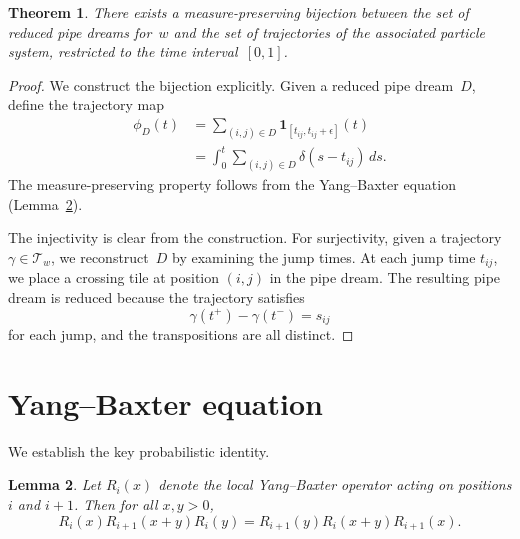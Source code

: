 \documentclass{amsart}
\theoremstyle{plain}
\newtheorem{theorem}{Theorem}[section]
\newtheorem{lemma}[theorem]{Lemma}
\theoremstyle{definition}
\theoremstyle{remark}
\begin{document}
\begin{theorem}
\label{thm:main-bijection}
There exists a measure-preserving bijection between the set of reduced
pipe dreams for~$w$ and the set of trajectories of the associated
particle system, restricted to the time interval~$[0,1]$.
\end{theorem}
\begin{proof}
We construct the bijection explicitly.  Given a reduced pipe dream~$D$,
define the trajectory map
\begin{align}
\label{eq:trajectory}
\phi_D(t) &= \sum_{(i,j) \in D} \mathbf{1}_{[t_{ij}, t_{ij} + \epsilon]}(t) \\
           &= \int_0^t \sum_{(i,j) \in D} \delta(s - t_{ij})\, ds.
\end{align}
The measure-preserving property follows from the Yang--Baxter equation
(Lemma~\ref{lem:yb-measure}).

The injectivity is clear from the construction.  For surjectivity, given a
trajectory $\gamma \in \mathcal{T}_w$, we reconstruct~$D$ by examining
the jump times.  At each jump time $t_{ij}$, we place a crossing tile at
position $(i,j)$ in the pipe dream.  The resulting pipe dream is reduced
because the trajectory satisfies
\begin{equation}
\label{eq:reduced-condition}
\gamma(t^+) - \gamma(t^-) = s_{ij}
\end{equation}
for each jump, and the transpositions are all distinct.
\end{proof}

\section{Yang--Baxter equation}
\label{sec:yang-baxter}
We establish the key probabilistic identity.

\begin{lemma}
\label{lem:yb-measure}
Let $R_i(x)$ denote the local Yang--Baxter operator acting on positions
$i$ and $i+1$.  Then for all $x, y > 0$,
\[
R_i(x) R_{i+1}(x+y) R_i(y) = R_{i+1}(y) R_i(x+y) R_{i+1}(x).
\]
\end{lemma}
\end{document}
